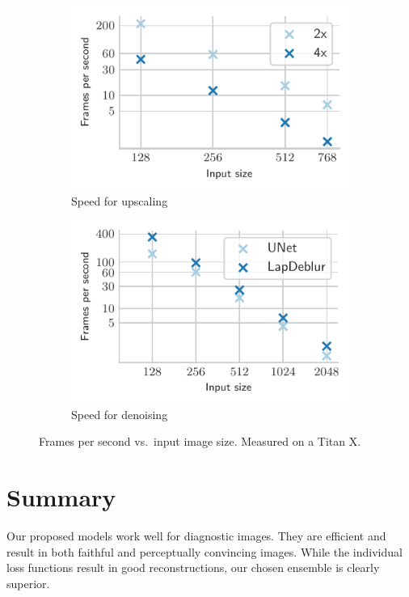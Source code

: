 \documentclass{scrartcl}
\begin{document}
\begin{figure}[htb]
\centering
\begin{subfigure}{0.45\textwidth}
\centering
    \includegraphics[]{time_upscaling_paper}
    \caption{Speed for upscaling}
\end{subfigure}\quad\qquad%
\begin{subfigure}{0.45\textwidth}
\centering
    \includegraphics{time_denoising_paper}
    \caption{Speed for denoising}
\end{subfigure}
\caption{Frames per second vs.\ input image size.
Measured on a Titan X.}
\label{fig:benchmark}
\end{figure}

\section{Summary}
Our proposed models work well for diagnostic images.
They are efficient and result in both faithful and perceptually convincing images.
While the individual loss functions result in good reconstructions, our chosen ensemble is clearly superior.
\end{document}
